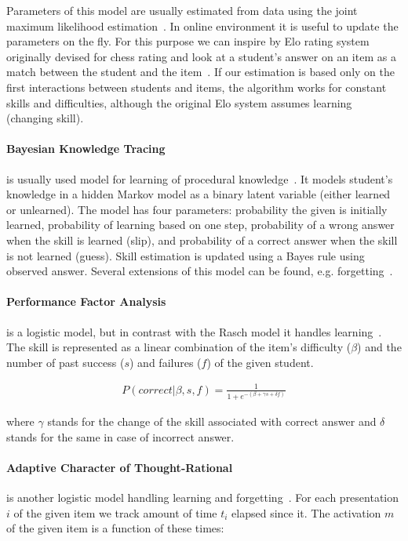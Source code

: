 \documentclass[table,color,cover,twoside,nolot,nolof]{fithesis3/fithesis3}
\begin{document}
Parameters of this model are usually estimated from data using the joint
maximum likelihood estimation~\cite{de2008theory}. In online environment it is
useful to update the parameters on the fly. For this purpose we can inspire by
Elo rating system~\cite{elo1978rating} originally devised for chess rating and
look at a student's answer on an item as a match between the student and
the item~\cite{papousek2014adaptive}. If our estimation is based only on the
first interactions between students and items, the algorithm works for constant
skills and difficulties, although the original Elo system assumes learning (changing skill).

\paragraph*{Bayesian Knowledge Tracing} is usually used model for
learning of procedural knowledge~\cite{van2013properties}. It models student's
knowledge in a hidden Markov model as a binary latent variable (either learned
or unlearned). The model has four parameters: probability the given is
initially learned, probability of learning based on one step, probability of
a wrong answer when the skill is learned (slip), and probability of a correct
answer when the skill is not learned (guess). Skill estimation is updated using
a Bayes rule using observed answer.  Several extensions of this model can be
found, e.g.  forgetting~\cite{qiu2010does}.

\paragraph*{Performance Factor Analysis} is a logistic model, but in contrast
with the Rasch model it handles learning~\cite{pavlik2009performance}. The
skill is represented as a linear combination of the item's difficulty ($\beta$)
and the number of past success ($s$) and failures ($f$) of the given student.

\begin{align}
P(correct|\beta,s, f) = \frac{1}{1 + e^{-(\beta + \gamma s + \delta f)}}
\end{align}

where $\gamma$ stands for the change of the skill associated with correct
answer and $\delta$ stands for the same in case of incorrect answer.

\paragraph*{Adaptive Character of Thought-Rational} is another logistic model
handling learning and forgetting~\cite{pavlik2005practice}. For each
presentation $i$ of the given item we track amount of time $t_i$ elapsed since
it. The activation $m$ of the given item is a function of these times:
\end{document}
